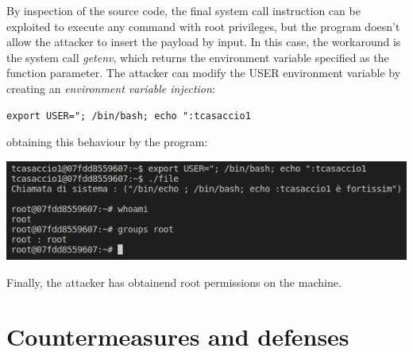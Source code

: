 \documentclass[a4paper, 12pt, oneside]{extbook}
\begin{document}
By inspection of the source code, the final system call instruction can be exploited to 
execute any command with root privileges, but the program doesn't allow the attacker to insert the 
payload by input. In this case, the workaround is the system call \textit{getenv}, which returns the environment 
variable specified as the function parameter. The attacker can modify the USER environment variable 
by creating an \textit{environment variable injection}:
\begin{lstlisting}[style=DOS]
  export USER="; /bin/bash; echo ":tcasaccio1
\end{lstlisting}
obtaining this behaviour by the program:
\begin{center}
  \includegraphics[scale=0.9]{../Image/privilege_escalation_exploit.PNG}
\end{center}
Finally, the attacker has obtainend root permissions on the machine.



\chapter{Countermeasures and defenses}
\end{document}
